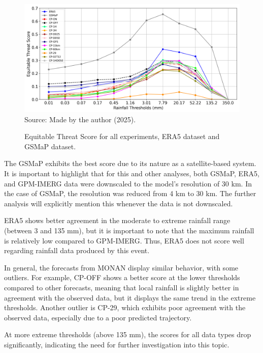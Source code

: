 \begin{figure}[!ht]
	\centering
	\caption{Equitable Threat Score for all experiments, ERA5 dataset and GSMaP dataset.} %
	\includegraphics[width=\textwidth]{docs/figuras/chapter5/ets_all_experiments_logx_FINAL.png} 
	\vspace{0.5em}
	Source: Made by the author (2025).  %
	\label{fig:threatscore} %
\end{figure}

The GSMaP exhibits the best score due to its nature as a satellite-based system. It is important to highlight that for this and other analyses, both GSMaP, ERA5, and GPM-IMERG data were downscaled to the model's resolution of 30 km. In the case of GSMaP, the resolution was reduced from 4 km to 30 km. The further analysis will explicitly mention this whenever the data is not downscaled.

ERA5 shows better agreement in the moderate to extreme rainfall range (between 3 and 135 mm), but it is important to note that the maximum rainfall is relatively low compared to GPM-IMERG. Thus, ERA5 does not score well regarding rainfall data produced by this event.

In general, the forecasts from MONAN display similar behavior, with some outliers. For example, CP-OFF shows a better score at the lower thresholds compared to other forecasts, meaning that local rainfall is slightly better in agreement with the observed data, but it displays the same trend in the extreme thresholds. Another outlier is CP-29, which exhibits poor agreement with the observed data, especially due to a poor predicted trajectory.

At more extreme thresholds (above 135 mm), the scores for all data types drop significantly, indicating the need for further investigation into this topic.

